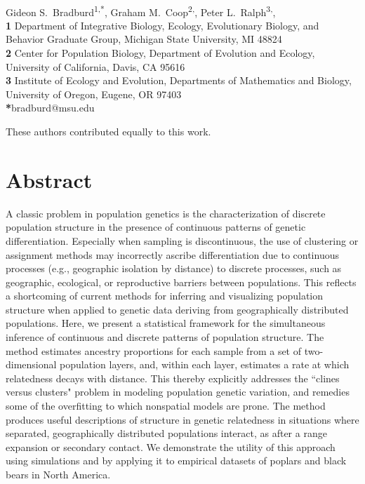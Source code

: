 \documentclass[10pt,letterpaper]{article}
\date{}
\begin{document}
\vspace*{0.2in}

\begin{flushleft}
{\Large
\textbf{}
}
\newline
\\
Gideon S.\  Bradburd\textsuperscript{1,*},
Graham M.\  Coop\textsuperscript{2,\Yinyang},
Peter L.\  Ralph\textsuperscript{3,\Yinyang},
\\
\bigskip
\textbf{1}
Department of Integrative Biology, 
Ecology, Evolutionary Biology, and Behavior Graduate Group,
Michigan State University, MI 48824
\\
\textbf{2}
Center for Population Biology,
Department of Evolution and Ecology, 
University of California, Davis, CA 95616
\\
\textbf{3} 
Institute of Ecology and Evolution,
Departments of Mathematics and Biology,
University of Oregon, Eugene, OR 97403
\\
\bigskip
\textbf{*}bradburd@msu.edu

\bigskip

%
\Yinyang These authors contributed equally to this work.

\end{flushleft}
\section*{Abstract}

A classic problem in population genetics is the characterization 
of discrete population structure in the presence of 
continuous patterns of genetic differentiation.
Especially when sampling is discontinuous, 
the use of clustering or assignment methods may incorrectly ascribe
differentiation due to continuous processes (e.g., geographic isolation by distance)
to discrete processes, such as geographic, ecological, or reproductive barriers 
between populations.
This reflects a shortcoming of current methods for inferring and 
visualizing population structure when applied to genetic data
deriving from geographically distributed populations.
Here, we present a statistical framework for the simultaneous inference 
of continuous and discrete patterns of population structure.
The method estimates ancestry proportions for each 
sample from a set of two-dimensional population layers, 
and, within each layer, estimates a rate at which relatedness decays with distance.
This thereby explicitly addresses the ``clines versus clusters" problem in 
modeling population genetic variation,
and remedies some of the overfitting to which nonspatial models are prone.
The method produces useful descriptions of structure in genetic relatedness
in situations where separated, geographically distributed populations interact,
as after a range expansion or secondary contact.
We demonstrate the utility of this approach using simulations 
and by applying it to empirical datasets of poplars and black bears in North America.
\end{document}
